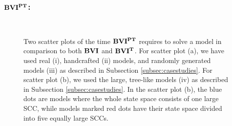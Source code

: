 \subsubsection*{\underline{$\TOPAlg$}:}
\begin{figure}[h!]
    \centering
    \
    \caption[$\TOPAlg$ compared to $\BVI$ with and without the topological optimization]{
        Two scatter plots of the time $\TOPAlg$ requires to solve a model in comparison to both $\BVI$ and $\mathbf{BVI^T}$.
        For scatter plot (a), we have used real (i), handcrafted (ii) models, and randomly generated models (iii) as described in Subsection \ref{subsec:casestudies}.
        For scatter plot (b), we used the large, tree-like models (iv) as described in Subsection \ref{subsec:casestudies}. In the scatter plot (b),
        the blue dots are models where the whole state space consists of one large SCC, while models marked red dots have their state space divided into five equally large SCCs.
    }
    \label{fig:colorScatterBviTop}
\end{figure}

